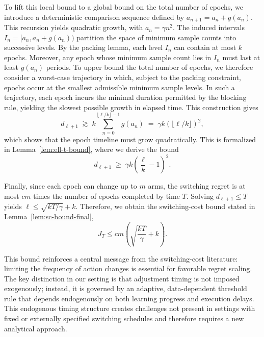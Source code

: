 \documentclass[opre,blindrev]{informs3}
\begin{document}
\begin{APPENDICES}
To lift this local bound to a global bound on the total number of epochs, we introduce a deterministic comparison sequence defined by \(a_{n+1}=a_n+g(a_n)\). This recursion yields quadratic growth, with \(a_n=\gamma n^2\). The induced intervals \(I_n=[a_n, a_n+g(a_n))\) partition the space of minimum sample counts into successive levels. By the packing lemma, each level \(I_n\) can contain at most \(k\) epochs. Moreover, any epoch whose minimum sample count lies in \(I_n\) must last at least \(g(a_n)\) periods. To upper bound the total number of epochs, we therefore consider a worst-case trajectory in which, subject to the packing constraint, epochs occur at the smallest admissible minimum sample levels. In such a trajectory, each epoch incurs the minimal duration permitted by the blocking rule, yielding the slowest possible growth in elapsed time. This construction gives
\[
    d_{\ell+1}
    \;\gtrsim\;
    k \sum_{n=0}^{\lfloor \ell/k\rfloor-1} g(a_n)
    \;=\;
    \gamma k \left(\lfloor \ell/k\rfloor\right)^2,
\]
which shows that the epoch timeline must grow quadratically. This is formalized in Lemma~\ref{lem:ell-t-bound}, where we derive the bound
\[
    d_{\ell+1}
    \;\ge\;
    \gamma k \left(\frac{\ell}{k}-1\right)^2.
\]

Finally, since each epoch can change up to \(m\) arms, the switching regret is at most \(cm\) times the number of epochs completed by time \(T\). Solving \(d_{\ell+1} \leq T\) yields \(\ell \leq \sqrt{kT/\gamma} + k\). Therefore, we obtain the switching-cost bound stated in Lemma~\ref{lem:sc-bound-final},
\[
    J_T \leq cm\left(\sqrt{\frac{kT}{\gamma}} + k\right).
\]

This bound reinforces a central message from the switching-cost literature: limiting the frequency of action changes is essential for favorable regret scaling. The key distinction in our setting is that adjustment timing is not imposed exogenously; instead, it is governed by an adaptive, data-dependent threshold rule that depends endogenously on both learning progress and execution delays. This endogenous timing structure creates challenges not present in settings with fixed or externally specified switching schedules and therefore requires a new analytical approach.


\end{APPENDICES}
\end{document}
